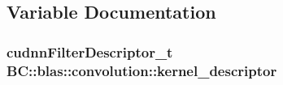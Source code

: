 \subsection{Variable Documentation}
\subsubsection[{\texorpdfstring{kernel\+\_\+descriptor}{kernel_descriptor}}]{\setlength{\rightskip}{0pt plus 5cm}cudnn\+Filter\+Descriptor\+\_\+t B\+C\+::blas\+::convolution\+::kernel\+\_\+descriptor}\hypertarget{namespaceBC_1_1blas_1_1convolution_a6fe3450977c24517c281f840aafd358e}{}\label{namespaceBC_1_1blas_1_1convolution_a6fe3450977c24517c281f840aafd358e}
